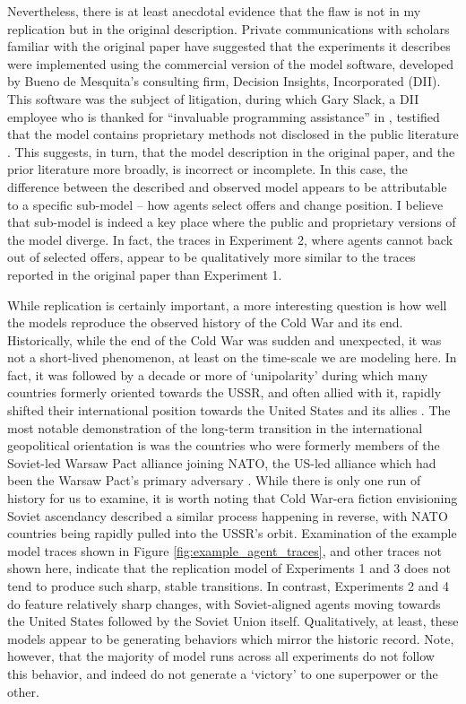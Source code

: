 Nevertheless, there is at least anecdotal evidence that the flaw is not in my replication but in the original description. Private communications with scholars familiar with the original paper have suggested that the experiments it describes were implemented using the commercial version of the model software, developed by Bueno de Mesquita's consulting firm, Decision Insights, Incorporated (DII). This software was the subject of litigation, during which Gary Slack, a DII employee who is thanked for ``invaluable programming assistance'' in \citet{bdm_1998}, testified that the model contains proprietary methods not disclosed in the public literature \citep{dii_2011}. This suggests, in turn, that the model description in the original paper, and the prior literature more broadly, is incorrect or incomplete. In this case, the difference between the described and observed model appears to be attributable to a specific sub-model -- how agents select offers and change position. I believe that sub-model is indeed a key place where the public and proprietary versions of the model diverge. In fact, the traces in Experiment 2, where agents cannot back out of selected offers, appear to be qualitatively more similar to the traces reported in the original paper than Experiment 1.

While replication is certainly important, a more interesting question is how well the models reproduce the observed history of the Cold War and its end. Historically, while the end of the Cold War was sudden and unexpected, it was not a short-lived phenomenon, at least on the time-scale we are modeling here. In fact, it was followed by a decade or more of `unipolarity' during which many countries formerly oriented towards the USSR, and often allied with it, rapidly shifted their international position towards the United States and its allies \citep{wohlforth_1999}. The most notable demonstration of the long-term transition in the international geopolitical orientation is was the countries who were formerly members of the Soviet-led Warsaw Pact alliance joining NATO, the US-led alliance which had been the Warsaw Pact's primary adversary \citep{waltz_2000}. While there is only one run of history for us to examine, it is worth noting that Cold War-era fiction envisioning Soviet ascendancy \citep[e.g.][]{milius_1984} described a similar process happening in reverse, with NATO countries being rapidly pulled into the USSR's orbit. Examination of the example model traces shown in Figure \ref{fig:example_agent_traces}, and other traces not shown here, indicate that the replication model of Experiments 1 and 3 does not tend to produce such sharp, stable transitions. In contrast, Experiments 2 and 4 do feature relatively sharp changes, with Soviet-aligned agents moving towards the United States followed by the Soviet Union itself. Qualitatively, at least, these models appear to be generating behaviors which mirror the historic record. Note, however, that the majority of model runs across all experiments do not follow this behavior, and indeed do not generate a `victory' to one superpower or the other.

